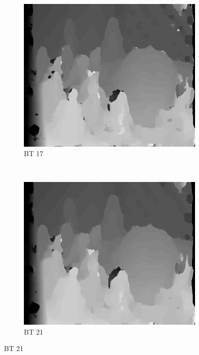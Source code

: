 \begin{figure}
\begin{subfigure}[b]{0.23\textwidth}
    \centering
    \includegraphics[width=\textwidth]{images/stereo-pairs/cones_bt_17.png}
    \caption{BT 17}
  \end{subfigure}
  ~
  \begin{subfigure}[b]{0.23\textwidth}
    \centering
    \includegraphics[width=\textwidth]{images/stereo-pairs/cones_bt_21.png}
    \caption{BT 21}
  \end{subfigure}



\end{figure}
